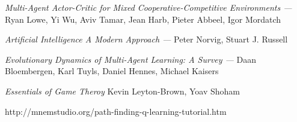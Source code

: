 \documentclass[]{report}
\begin{document}
\begin{thebibliography}{9}
	\emph{ Multi-Agent Actor-Critic for Mixed Cooperative-Competitive Environments ---}
	Ryan Lowe, Yi Wu, Aviv Tamar, Jean Harb, Pieter Abbeel, Igor Mordatch
	
	\emph{Artificial Intelligence A Modern Approach ---}
	Peter Norvig, Stuart J. Russell
	
	\emph{Evolutionary Dynamics of Multi-Agent Learning: A Survey ---}
	Daan Bloembergen, Karl Tuyls, Daniel Hennes, Michael Kaisers
	
	\emph{Essentials of Game Theroy}
	Kevin Leyton-Brown, Yoav Shoham
	
	http://mnemstudio.org/path-finding-q-learning-tutorial.htm
\end{thebibliography}
\end{document}
